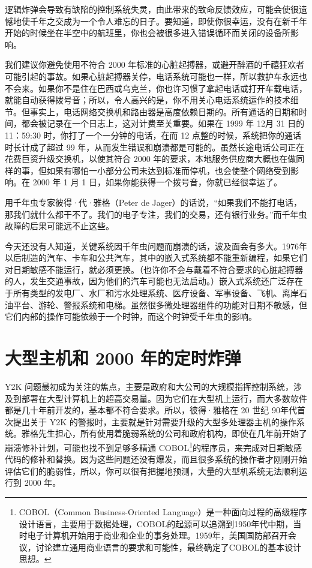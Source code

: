 逻辑炸弹会导致有缺陷的控制系统失灵，由此带来的致命反馈效应，可能会使很遗憾地使千年之交成为一个令人难忘的日子。要知道，即使你很幸运，没有在新千年开始的时候坐在半空中的航班里，你也会被很多进入错误循环而关闭的设备所影响。


我们建议你避免使用不符合 2000 年标准的心脏起搏器，或避开醉酒的千禧狂欢者可能引起的事故。如果心脏起搏器关停，电话系统可能也一样，所以救护车永远也不会来。如果你不是住在巴西或乌克兰，你也许习惯了拿起电话或打开车载电话，就能自动获得拨号音；所以，令人高兴的是，你不用关心电话系统运作的技术细节。但事实上，电话网络交换机和路由器是高度依赖日期的。所有通话的日期和时间，都会被记录在一个日志上，这对计费至关重要。如果在 1999 年 12月 31 日的 11：59:30 时，你打了一个一分钟的电话，在而 12 点整的时候，系统把你的通话时长计成了超过 99 年，从而发生错误和崩溃都是可能的。虽然长途电话公司正在花费巨资升级交换机，以使其符合 2000 年的要求，本地服务供应商大概也在做同样的事，但如果有哪怕一小部分公司未达到标准而停机，也会使整个网络受到影响。在 2000 年 1 月 1 日，如果你能获得一个拨号音，你就已经很幸运了。


用千年虫专家彼得·代·雅格（Peter de Jager）的话说，“如果我们不能打电话，那我们就什么都干不了。我们的电子专注，我们的交易，还有银行业务。”而千年虫故障的后果可能远不止这些。


今天还没有人知道，关键系统因千年虫问题而崩溃的话，波及面会有多大。1976年以后制造的汽车、卡车和公共汽车，其中的嵌入式系统都不能重新编程，如果它们对日期敏感不能运行，就必须更换。（也许你不会与戴着不符合要求的心脏起搏器的人，发生交通事故，因为他们的汽车可能也无法启动。）嵌入式系统还广泛存在于所有类型的发电厂、水厂和污水处理系统、医疗设备、军事设备、飞机、离岸石油平台、游轮、警报系统和电梯。虽然很多微处理器组件的功能对日期不敏感，但它们内部的操作可能依赖于一个时钟，而这个时钟受千年虫的影响。


\section{大型主机和 2000 年的定时炸弹}
Y2K 问题最初成为关注的焦点，主要是政府和大公司的大规模指挥控制系统，涉及到部署在大型计算机上的超高交易量。因为它们在大型机上运行，而大多数软件都是几十年前开发的，基本都不符合要求。所以，彼得·雅格在 20 世纪 90年代首次提出关于 Y2K 的警报时，主要就是针对需要升级的大型多处理器主机的操作系统。雅格先生担心，所有使用着脆弱系统的公司和政府机构，即使在几年前开始了崩溃修补计划，可能也找不到足够多精通 COBOL\footnote{COBOL（Common Business-Oriented Language）是一种面向过程的高级程序设计语言，主要用于数据处理，COBOL的起源可以追溯到1950年代中期，当时电子计算机开始用于商业和企业的事务处理。1959年，美国国防部召开会议，讨论建立通用商业语言的要求和可能性，最终确定了COBOL的基本设计思想。}的程序员，来完成对日期敏感代码的修补和替换。因为这些问题还没有爆发，而且很多系统的操作者才刚刚开始评估它们的脆弱性，所以，你可以很有把握地预测，大量的大型机系统无法顺利运行到 2000 年。


